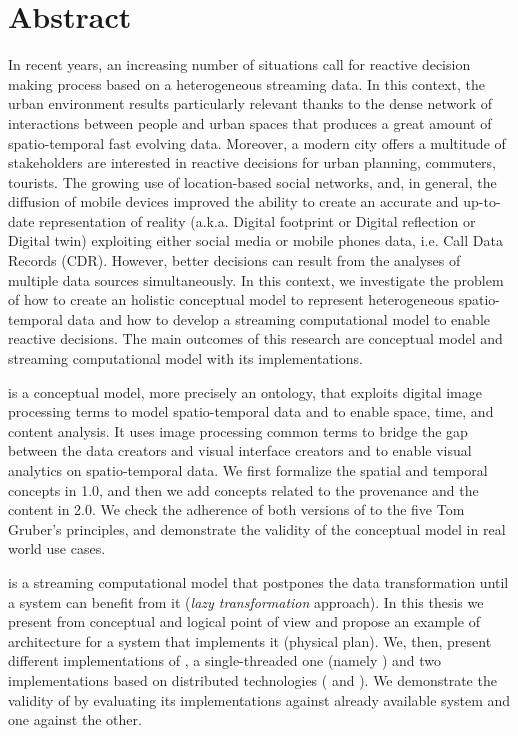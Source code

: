 \chapter*{Abstract}

In recent years, an increasing number of situations call for reactive decision making process based on a heterogeneous streaming data.
In this context, the urban environment results particularly relevant thanks to the dense network of interactions between people and urban spaces that produces a great amount of spatio-temporal fast evolving data. Moreover, a modern city offers a multitude of stakeholders are interested in reactive decisions for urban planning, commuters, tourists.
The growing use of location-based social networks, and, in general, the diffusion of mobile devices improved the ability to create an accurate and up-to-date representation of reality (a.k.a. Digital footprint or Digital reflection or Digital twin) exploiting either social media or mobile phones data, i.e. Call Data Records (CDR).
However, better decisions can result from the analyses of multiple data sources simultaneously. 
In this context, we investigate the problem of how to create an holistic conceptual model to represent heterogeneous spatio-temporal data and how to develop a streaming computational model to enable reactive decisions.
The main outcomes of this research are \frappe{} conceptual model and \river{} streaming computational model with its implementations.

\frappe{} is a conceptual model, more precisely an ontology, that exploits digital image processing terms to model spatio-temporal data and to enable space, time, and content analysis.
It uses image processing common terms to bridge the gap between the data creators and visual interface creators and to enable visual analytics on spatio-temporal data.
We first formalize the spatial and temporal concepts in \frappe{} 1.0, and then we add concepts related to the provenance and the content in \frappe{} 2.0.
We check the adherence of both versions of \frappe{} to the five Tom Gruber's principles, and demonstrate the validity of the conceptual model in real world use cases.

\river{} is a streaming computational model that postpones the data transformation until a system can benefit from it (\textit{lazy transformation} approach). In this thesis we present \river{} from conceptual and logical point of view and propose an example of architecture for a system that implements it (physical plan).
We, then, present different implementations of \river{}, a single-threaded one (namely \sti{}) and two implementations based on distributed technologies (\sparkdi{} and \hivedi{}).
We demonstrate the validity of \river{} by evaluating its implementations against already available system and one against the other.

